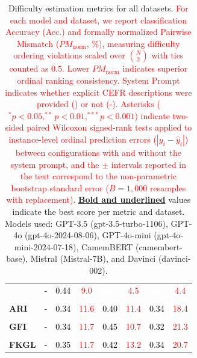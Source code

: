 \begin{table}[!htbp]
\begin{tabular}{lccccccc}
         & - & \cellcolor[HTML]{8ea5d2}\textcolor{black}{0.44} & \cellcolor[HTML]{c0cce5}\textcolor{red}{9.0} & \cellcolor[HTML]{6382c0}\textcolor{white}{0.61} & \cellcolor[HTML]{1c4aa4}\textcolor{red}{4.5} & \cellcolor[HTML]{3059ac}\textcolor{white}{0.81} & \cellcolor[HTML]{244fa7}\textcolor{red}{4.4} \\
        \\[2pt]
        \textbf{ARI} & - & \cellcolor[HTML]{a8b9dc}\textcolor{black}{0.34} & \cellcolor[HTML]{fcfdfe}\textcolor{red}{11.6} & \cellcolor[HTML]{99add6}\textcolor{black}{0.40} & \cellcolor[HTML]{6281c0}\textcolor{red}{11.4} & \cellcolor[HTML]{a8b9dc}\textcolor{black}{0.34} & \cellcolor[HTML]{c4d0e7}\textcolor{red}{18.4} \\
        \\[2pt]
        \textbf{GFI} & - & \cellcolor[HTML]{a8b9dc}\textcolor{black}{0.34} & \cellcolor[HTML]{ffffff}\textcolor{red}{11.7} & \cellcolor[HTML]{8ca3d1}\textcolor{black}{0.45} & \cellcolor[HTML]{5a7bbd}\textcolor{red}{10.7} & \cellcolor[HTML]{adbdde}\textcolor{black}{0.32} & \cellcolor[HTML]{e5eaf4}\textcolor{red}{21.3} \\
        \\[2pt]
        \textbf{FKGL} & - & \cellcolor[HTML]{a5b7db}\textcolor{black}{0.35} & \cellcolor[HTML]{fefefe}\textcolor{red}{11.7} & \cellcolor[HTML]{93a9d4}\textcolor{black}{0.42} & \cellcolor[HTML]{738fc7}\textcolor{red}{13.2} & \cellcolor[HTML]{a8b9dc}\textcolor{black}{0.34} & \cellcolor[HTML]{dfe5f2}\textcolor{red}{20.7} \\
        \bottomrule
    \end{tabular}
    \caption{Difficulty estimation metrics for all datasets. \textcolor{red}{For each model and dataset, we report classification Accuracy (Acc.) and formally normalized Pairwise Mismatch ($PM_{\text{norm}}$, \%), measuring difficulty ordering violations scaled over $\binom{N}{2}$ with ties counted as $0.5$. Lower $PM_{\text{norm}}$ indicates superior ordinal ranking consistency. System Prompt indicates whether explicit CEFR descriptions were provided (\checkmark) or not (-). Asterisks ($^{*}p<0.05, ^{**}p<0.01, ^{***}p<0.001$) indicate two-sided paired Wilcoxon signed-rank tests applied to instance-level ordinal prediction errors ($|y_i - \hat{y}_i|$) between configurations with and without the system prompt, and the $\pm$ intervals reported in the text correspond to the non-parametric bootstrap standard error ($B = 1{,}000$ resamples with replacement).} \textbf{\underline{Bold and underlined}} values indicate the best score per metric and dataset. Models used: GPT-3.5 (gpt-3.5-turbo-1106), GPT-4o (gpt-4o-2024-08-06), GPT-4o-mini (gpt-4o-mini-2024-07-18), CamemBERT (camembert-base), Mistral (Mistral-7B), and Davinci (davinci-002).}
    \label{tab:difficulty_estimation_metrics}
\end{table}

